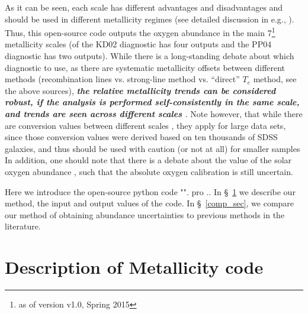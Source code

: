 \documentclass{emulateapj}
\begin{document}
As it can be seen, each scale has different advantages and disadvantages and should be used in different metallicity regimes (see detailed discussion in e.g.,  \citealt{kewley02,stasinska02,kewley08,moustakas10,dopita13,blanc15}). Thus, this open-source code outputs the oxygen abundance in the main 7\footnote{as of version v1.0, Spring 2015} metallicity scales (of the KD02 diagnostic has four outputs and the PP04 diagnostic has two outputs). While there is a long-standing debate about which diagnostic to use, as there are systematic metallicity offsets between different methods (recombination lines vs. strong-line method vs. ``direct'' $T_e$ method, see the above sources), \emph{\bf the relative metallicity trends can be considered robust, if the analysis is performed self-consistently in the same scale, and trends are seen across different scales \citep{kewley08,moustakas10}}. Note however, that while there are conversion values between different scales \citep{kewley08}, they apply for large data sets, since those conversion values were derived based on ten thousands of SDSS galaxies, and thus should be used with caution (or not at all) for smaller samples
In addition, one should note that there is a debate about the value of the solar oxygen abundance \citep{asplund09_rev,chaffau11}, such that the absolute oxygen calibration is still uncertain.




Here we introduce the open-source python code "". pro .. In \S~\ref{method_sec} we describe our method, the input and output values of the code. In \S~\ref{comp_sec}, we compare our method of obtaining abundance uncertainties to previous methods in the literature. 


\section{Description of Metallicity code}\label{method_sec}
\end{document}
